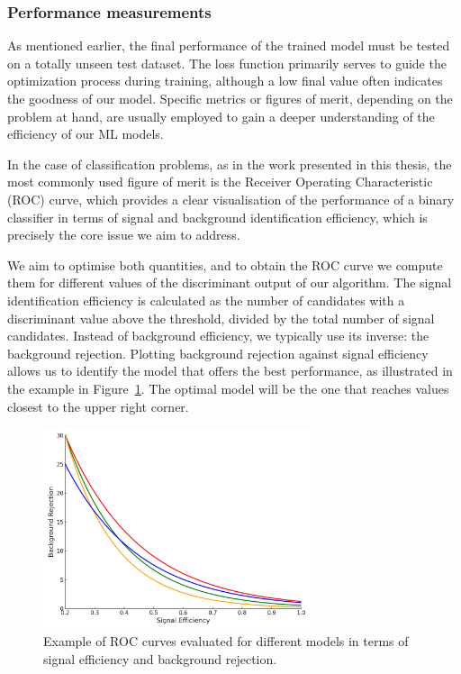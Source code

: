 \subsubsection*{Performance measurements}
As mentioned earlier, the final performance of the trained model must be tested on a totally unseen test dataset. The loss function primarily serves to guide the optimization process during training, although a low final value often indicates the goodness of our model. Specific metrics or figures of merit, depending on the problem at hand, are usually employed to gain a deeper understanding of the efficiency of our ML models.

In the case of classification problems, as in the work presented in this thesis, the most commonly used figure of merit is the Receiver Operating Characteristic (ROC) curve, which provides a clear visualisation of the performance of a binary classifier in terms of signal and background identification efficiency, which is precisely the core issue we aim to address.

We aim to optimise both quantities, and to obtain the ROC curve we compute them for different values of the discriminant output of our algorithm. The signal identification efficiency is calculated as the number of candidates with a discriminant value above the threshold, divided by the total number of signal candidates. Instead of background efficiency, we typically use its inverse: the background rejection. Plotting background rejection against signal efficiency allows us to identify the model that offers the best performance, as illustrated in the example in Figure~\ref{fig:roc_curves}. The optimal model will be the one that reaches values closest to the upper right corner.

\begin{figure}[htbp]
    \centering
    \includegraphics[width=0.7\textwidth]{images/roc_curves_clean.png}
    \caption{Example of ROC curves evaluated for different models in terms of signal efficiency and background rejection.}
    \label{fig:roc_curves}
  \end{figure}

